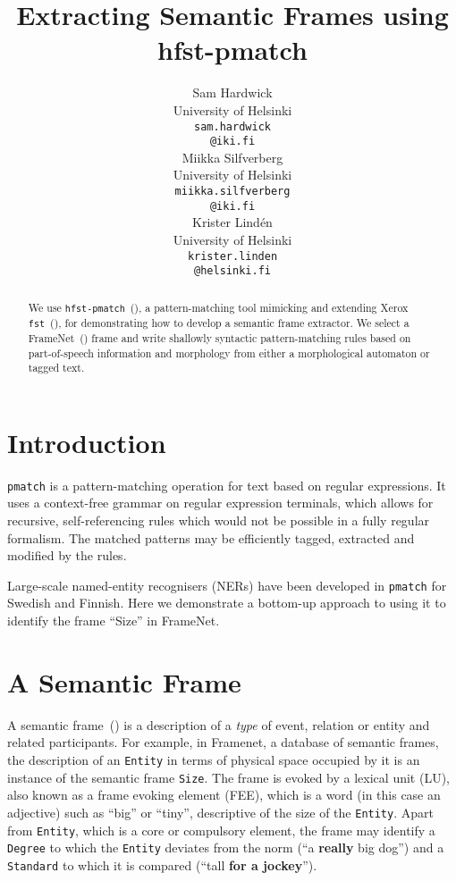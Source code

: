 \documentclass[11pt]{article}
\title{Extracting Semantic Frames using hfst-pmatch}
\author{Sam Hardwick \\
  University of Helsinki \\
  {\tt sam.hardwick} \\ {\tt @iki.fi} \\\And
  Miikka Silfverberg \\
  University of Helsinki \\
  {\tt miikka.silfverberg} \\ {\tt @iki.fi}\\\And
  Krister Lind{é}n \\
  University of Helsinki \\
  {\tt krister.linden} \\ {\tt @helsinki.fi}}
\date{}
\begin{document}
\maketitle
\begin{abstract}
  We use \verb+hfst-pmatch+~(), a
  pattern-matching tool mimicking and extending Xerox
  \verb+fst+~(), for demonstrating how to develop a
  semantic frame extractor. We
  select a FrameNet~() frame and write shallowly syntactic pattern-matching rules
  based on part-of-speech information and morphology from either a morphological automaton or
  tagged text.
\end{abstract}

\section{Introduction}
\verb+pmatch+ is a pattern-matching operation for text based on regular
expressions. It uses a context-free grammar on regular expression terminals,
which allows for recursive, self-referencing rules which would not be possible
in a fully regular formalism. The matched patterns may be efficiently tagged,
extracted and modified by the rules.

Large-scale named-entity recognisers (NERs) have been developed in
\verb+pmatch+ for Swedish and Finnish. Here we demonstrate a bottom-up approach
to using it to identify the frame ``Size'' in FrameNet.

\section{A Semantic Frame}

A semantic frame~() is a description of a \emph{type} of event, relation or entity
and related participants. For example, in Framenet,
a database of semantic frames,
the description of an \verb+Entity+ in terms of physical space occupied by it is
an instance of the semantic frame \verb+Size+. The frame is evoked by
a lexical unit (LU), also known as a frame evoking element (FEE), which is a
word (in this case an adjective)
such as ``big'' or ``tiny'', descriptive of the size of the \verb+Entity+.
Apart from \verb+Entity+, which is a core or compulsory element, the
frame may identify a \verb+Degree+ to which the \verb+Entity+ deviates
from the norm (``a \textbf{really} big dog'') and a \verb+Standard+ to
which it is compared (``tall \textbf{for a jockey}'').
\end{document}
